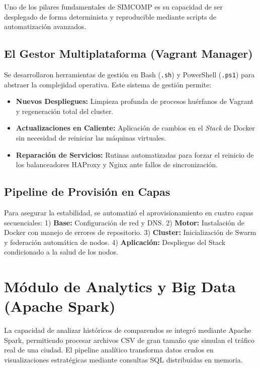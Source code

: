\documentclass[conference]{IEEEtran}
\begin{document}
Uno de los pilares fundamentales de SIMCOMP es su capacidad de ser desplegado de forma determinista y reproducible mediante scripts de automatización avanzados.

\subsection{El Gestor Multiplataforma (Vagrant Manager)}
Se desarrollaron herramientas de gestión en Bash (\texttt{.sh}) y PowerShell (\texttt{.ps1}) para abstraer la complejidad operativa. Este sistema de gestión permite:
\begin{itemize}
    \item \textbf{Nuevos Despliegues:} Limpieza profunda de procesos huérfanos de Vagrant y regeneración total del cluster.
    \item \textbf{Actualizaciones en Caliente:} Aplicación de cambios en el \textit{Stack} de Docker sin necesidad de reiniciar las máquinas virtuales.
    \item \textbf{Reparación de Servicios:} Rutinas automatizadas para forzar el reinicio de los balanceadores HAProxy y Nginx ante fallos de sincronización.
\end{itemize}

\subsection{Pipeline de Provisión en Capas}
Para asegurar la estabilidad, se automatizó el aprovisionamiento en cuatro capas secuenciales:
1) \textbf{Base:} Configuración de red y DNS.
2) \textbf{Motor:} Instalación de Docker con manejo de errores de repositorio.
3) \textbf{Cluster:} Inicialización de Swarm y federación automática de nodos.
4) \textbf{Aplicación:} Despliegue del Stack condicionado a la salud de los nodos.

\section{Módulo de Analytics y Big Data (Apache Spark)}

La capacidad de analizar históricos de comparendos se integró mediante Apache Spark, permitiendo procesar archivos CSV de gran tamaño que simulan el tráfico real de una ciudad. El pipeline analítico transforma datos crudos en visualizaciones estratégicas mediante consultas SQL distribuidas en memoria.
\end{document}
